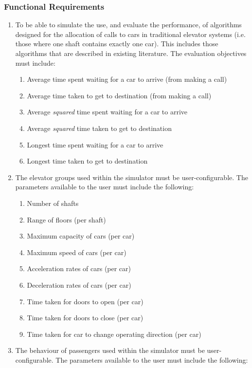 \documentclass{UoYCSproject}
\begin{document}
\subsubsection{Functional Requirements}

	\begin{enumerate}
		\item To be able to simulate the use, and evaluate the performance, of algorithms designed for the allocation of calls to cars in traditional elevator systems (i.e. those where one shaft contains exactly one car).  This includes those algorithms that are described in existing literature.  The evaluation objectives must include:
		\begin{enumerate}
			\item Average time spent waiting for a car to arrive (from making a call)
			\item Average time taken to get to destination (from making a call)
			\item Average \textit{squared} time spent waiting for a car to arrive
			\item Average \textit{squared} time taken to get to destination
			\item Longest time spent waiting for a car to arrive
			\item Longest time taken to get to destination
		\end{enumerate}
		\item The elevator groups used within the simulator must be user-configurable.  The parameters available to the user must include the following:
		\begin{enumerate}
			\item Number of shafts
			\item Range of floors (per shaft)
			\item Maximum capacity of cars (per car)
			\item Maximum speed of cars (per car)
			\item Acceleration rates of cars (per car)
			\item Deceleration rates of cars (per car)
			\item Time taken for doors to open (per car)
			\item Time taken for doors to close (per car)
			\item Time taken for car to change operating direction (per car)
		\end{enumerate}
		\item The behaviour of passengers used within the simulator must be user-configurable.  The parameters available to the user must include the following:

\end{enumerate}
\end{document}
